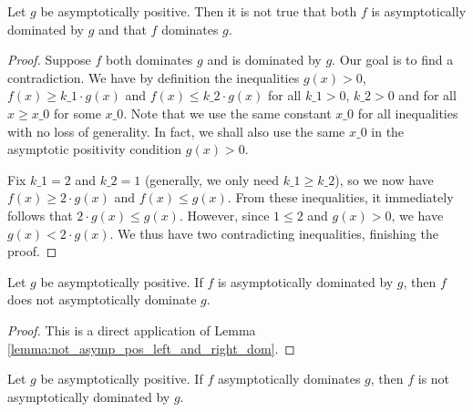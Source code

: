 \begin{lemma}
    \label{lemma:not_asymp_pos_left_and_right_dom}
    \leanok
    Let $g$ be asymptotically positive. Then it is not true that both $f$ is asymptotically
    dominated by $g$ and that $f$ dominates $g$.
\end{lemma}

\begin{proof}
    Suppose $f$ both dominates $g$ and is dominated by $g$. Our goal is to find a
    contradiction. We have by definition the inequalities $g(x) > 0$, 
    $f(x) \ge k\_1 \cdot g(x)$ and $f(x) \le k\_2 \cdot g(x)$ for all $k\_1 > 0$, 
    $k\_2 > 0$ and for all $x \ge x\_0$ for some $x\_0$. Note that we use the same 
    constant $x\_0$ for all inequalities with no loss of generality. In fact, we shall also use the same $x\_0$ 
    in the asymptotic positivity condition $g(x) > 0$.

    Fix $k\_1 = 2$ and $k\_2 = 1$ (generally, we only need $k\_1 \ge k\_2$), so we now have
    $f(x) \ge 2 \cdot g(x)$ and $f(x) \le g(x)$. From these inequalities, it immediately
    follows that $2 \cdot g(x) \le g(x)$. However, since $1 \le 2$ and $g(x) > 0$, we have
    $g(x) < 2 \cdot g(x)$. We thus have two contradicting inequalities, finishing the proof.
\end{proof}

\begin{theorem}
    \label{thm:not_asymp_pos_left_dom_of_right_dom}
    \leanok
    Let $g$ be asymptotically positive. If $f$ is asymptotically dominated by $g$, then
    $f$ does not asymptotically dominate $g$.
\end{theorem}

\begin{proof}
    \leanok
    This is a direct application of Lemma \ref{lemma:not_asymp_pos_left_and_right_dom}. 
\end{proof}

\begin{theorem}
    \label{thm:not_asymp_pos_right_dom_of_left_dom}
    \leanok
    Let $g$ be asymptotically positive. If $f$ asymptotically dominates $g$, then
    $f$ is not asymptotically dominated by $g$.
\end{theorem}

